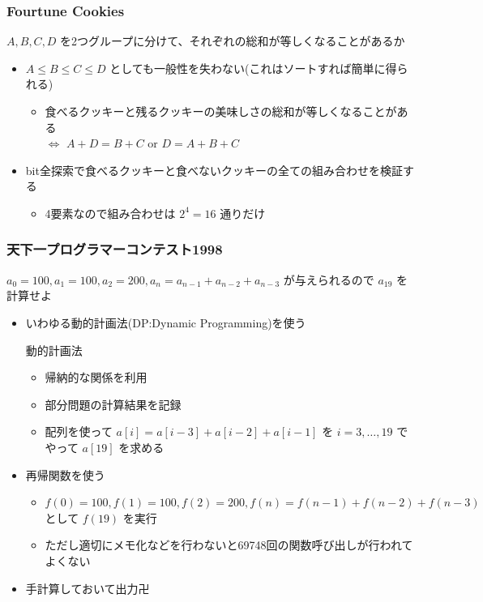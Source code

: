 \documentclass[t, aspectratio=169, dvipdfmx]{beamer}
\begin{document}
\begin{frame}
  \frametitle{Fourtune Cookies}
  $A,B,C,D$ を2つグループに分けて、それぞれの総和が等しくなることがあるか
  \begin{itemize}
    \item $A \leq B \leq C \leq D$ としても一般性を失わない(これはソートすれば簡単に得られる)
    \begin{itemize}
      \item 食べるクッキーと残るクッキーの美味しさの総和が等しくなることがある \\
      $\iff$ $A+D=B+C$ or $D=A+B+C$
    \end{itemize}
    \item bit全探索で食べるクッキーと食べないクッキーの全ての組み合わせを検証する
    \begin{itemize}
      \item 4要素なので組み合わせは $2^4=16$ 通りだけ
    \end{itemize}
  \end{itemize}
\end{frame}

\begin{frame}
  \frametitle{天下一プログラマーコンテスト1998}
  $a_0=100,a_1=100,a_2=200,a_{n}=a_{n-1}+a_{n-2}+a_{n-3}$ が与えられるので $a_{19}$ を計算せよ
  \begin{itemize}
    \item いわゆる動的計画法(DP:Dynamic Programming)を使う
    \begin{term}{動的計画法}
      \begin{itemize}
        \item 帰納的な関係を利用
        \item 部分問題の計算結果を記録
      \end{itemize}
    \end{term}
    \begin{itemize}
      \item 配列を使って $a[i]=a[i-3]+a[i-2]+a[i-1]$ を $i=3,\ldots,19$ でやって $a[19]$ を求める
    \end{itemize}
    \item 再帰関数を使う
    \begin{itemize}
      \item $f(0)=100, f(1)=100, f(2)=200, f(n)=f(n-1)+f(n-2)+f(n-3)$ として $f(19)$ を実行
      \item ただし適切にメモ化などを行わないと69748回の関数呼び出しが行われてよくない
    \end{itemize}
    \item 手計算しておいて出力卍
  \end{itemize}
\end{frame}
\end{document}
